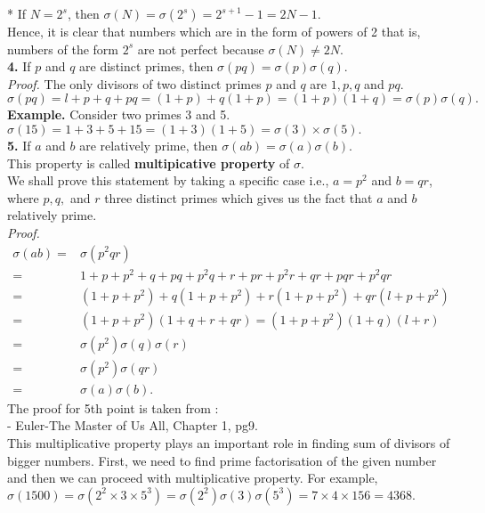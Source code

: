 \documentclass[a4paper,11pt]{article}
\begin{document}
* If $N = 2^s$, then
$\sigma(N) = \sigma(2^s) = 2^{s+1}-1 = 2N - 1.$\\
Hence, it is clear that numbers which are in the form of powers of 2 that is, numbers of the form $2^s$ are not perfect because $\sigma(N) \neq 2N.$\\
\textbf{4.} If $p$ and $q$ are distinct primes, then $\sigma(pq) = \sigma(p)\sigma(q)$. \\
\textit{Proof.} The only divisors of two distinct primes $p$ and $q$ are $1, p, q$
and $pq.$\\
 $\sigma(pq) = l + p + q + pq = (1+p) + q(1+p) = (1+p)(1+q) = \sigma(p)\sigma(q).$ \\
 \textbf{Example.} Consider two primes 3 and 5.\\
 $\sigma(15) = 1 + 3 + 5 + 15 = (1+3)(1+5) = \sigma(3) \times \sigma(5).$\\
\textbf{5.} If $a$ and $b$ are relatively prime, then $\sigma(ab) = \sigma(a)\sigma(b).$\\
This property is called \textbf{multipicative property} of $\sigma$.\\
We shall prove this statement by taking a specific case i.e.,
$a = p^2$ and $b = qr$, where $p, q,$ and $r$ three distinct primes which gives us the fact that $a$ and $b$ relatively prime.\\
\textit{Proof.}
\begin{align*}
\sigma(ab) =& \sigma(p^2qr) \\
=& 1 + p + p^2 + q + pq + p^2q + r + pr + p^2r + qr + pqr + p^2qr \\
=& (1 + p + p^2) + q(1 + p + p^2) + r(1 + p + p^2) + qr(l + p + p^2) \\
=& (1 + p + p^2)(1 + q + r + qr) = (1 + p + p^2)(1 + q)(l + r) \\
=& \sigma(p^2)\sigma(q)\sigma(r) \\
=& \sigma(p^2)\sigma(qr)\\
=& \sigma(a)\sigma(b).
\end{align*}
The proof for 5th point is taken from :\\
\vspace{2ex}
\hfill {- Euler-The Master of Us All, Chapter 1, pg9.}\\
This multiplicative property plays an important role in finding sum of divisors of bigger numbers. First, we need to find prime factorisation of the given number and then we can proceed with multiplicative property. For example,\\
$\sigma(1500) = \sigma(2^2\times3\times5^3) = \sigma(2^2)\sigma(3)\sigma(5^3) = 7 \times 4 \times 156 = 4368.$\\
\end{document}
